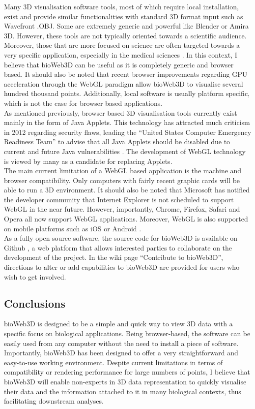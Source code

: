 Many 3D visualisation software tools, most of which require local installation, exist and provide similar functionalities with standard 3D format input such as Wavefront .OBJ. Some are extremely generic and powerful like Blender or Amira 3D. However, these tools are not typically oriented towards a scientific audience. Moreover, those that are more focused on science are often targeted towards a very specific application, especially in the medical sciences \cite{Wang093D}. In this context, I believe that bioWeb3D can be useful as it is completely generic and browser based. It should also be noted that recent browser improvements regarding GPU acceleration through the WebGL paradigm allow bioWeb3D to visualise several hundred thousand points. Additionally, local software is usually platform specific, which is not the case for browser based applications.\\

As mentioned previously, browser based 3D visualisation tools currently exist mainly in the form of Java Applets. This technology has attracted much criticism in 2012 regarding security flaws, leading the ``United States Computer Emergency Readiness Team'' to advise that all Java Applets should be disabled due to current and future Java vulnerabilities \cite{security}. The development of WebGL technology is viewed by many as a candidate for replacing Applets. \\


The main current limitation of a WebGL based application is the machine and browser compatibility. Only computers with fairly recent graphic cards will be able to run a 3D environment. It should also be noted that Microsoft has notified the developer community that Internet Explorer is not scheduled to support WebGL in the near future. However, importantly, Chrome, Firefox, Safari and Opera all now support WebGL applications. Moreover, WebGL is also supported on mobile platforms such as iOS or Android \cite{caniuse}.\\


As a fully open source software, the source code for bioWeb3D is available on Github \cite{github}, a web platform that allows interested parties to collaborate on the development of the project. In the wiki page ``Contribute to bioWeb3D'', directions to alter or add capabilities to bioWeb3D are provided for users who wish to get involved.

	\subsection{Conclusions}
bioWeb3D is designed to be a simple and quick way to view 3D data with a specific focus on biological applications.  Being browser-based, the software can be easily used from any computer without the need to install a piece of software. Importantly, bioWeb3D has been designed to offer a very straightforward and easy-to-use working environment. Despite current limitations in terms of compatibility or rendering performance for large numbers of points, I believe that bioWeb3D will enable non-experts in 3D data representation to quickly visualise their data and the information attached to it in many biological contexts, thus facilitating downstream analyses.


